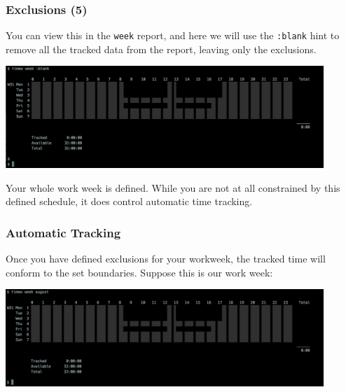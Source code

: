 \documentclass[t,handout]{beamer}
\begin{document}
\begin{frame}[fragile]\frametitle{Exclusions (5)}
    You can view this in the \verb=week= report, and here we will use the \verb=:blank= hint to remove all the tracked data from the report, leaving only the exclusions.

    \includegraphics[width=12cm]{images/tutorial34.png}

    Your whole work week is defined. While you are not at all constrained by this defined schedule, it does control automatic time tracking.
\end{frame}

\begin{frame}[fragile]\frametitle{Automatic Tracking}
    Once you have defined exclusions for your workweek, the tracked time will conform to the set boundaries. Suppose this is our work week:

    \includegraphics[width=12cm]{images/tutorial35.png}
\end{frame}
\end{document}
